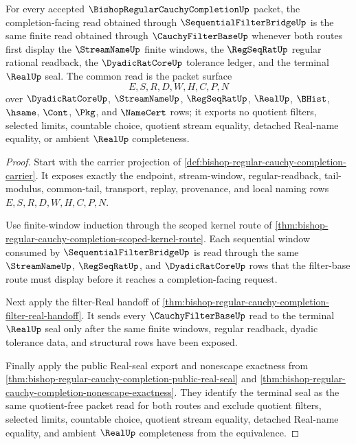 \begin{theorem}
\label{thm:bishop-regular-cauchy-completion-filterbase-sequential-equivalence}
For every accepted $\BishopRegularCauchyCompletionUp$ packet, the completion-facing read obtained through $\SequentialFilterBridgeUp$ is the same finite read obtained through $\CauchyFilterBaseUp$ whenever both routes first display the $\StreamNameUp$ finite windows, the $\RegSeqRatUp$ regular rational readback, the $\DyadicRatCoreUp$ tolerance ledger, and the terminal $\RealUp$ seal. The common read is the packet surface
$$
E,S,R,D,W,H,C,P,N
$$
over $\DyadicRatCoreUp$, $\StreamNameUp$, $\RegSeqRatUp$, $\RealUp$, $\BHist$, $\hsame$, $\Cont$, $\Pkg$, and $\NameCert$ rows; it exports no quotient filters, selected limits, countable choice, quotient stream equality, detached Real-name equality, or ambient $\RealUp$ completeness.
\end{theorem}
\begin{proof}
Start with the carrier projection of \autoref{def:bishop-regular-cauchy-completion-carrier}. It exposes exactly the endpoint, stream-window, regular-readback, tail-modulus, common-tail, transport, replay, provenance, and local naming rows $E,S,R,D,W,H,C,P,N$.

Use finite-window induction through the scoped kernel route of \autoref{thm:bishop-regular-cauchy-completion-scoped-kernel-route}. Each sequential window consumed by $\SequentialFilterBridgeUp$ is read through the same $\StreamNameUp$, $\RegSeqRatUp$, and $\DyadicRatCoreUp$ rows that the filter-base route must display before it reaches a completion-facing request.

Next apply the filter-Real handoff of \autoref{thm:bishop-regular-cauchy-completion-filter-real-handoff}. It sends every $\CauchyFilterBaseUp$ read to the terminal $\RealUp$ seal only after the same finite windows, regular readback, dyadic tolerance data, and structural rows have been exposed.

Finally apply the public Real-seal export and nonescape exactness from \autoref{thm:bishop-regular-cauchy-completion-public-real-seal} and \autoref{thm:bishop-regular-cauchy-completion-nonescape-exactness}. They identify the terminal seal as the same quotient-free packet read for both routes and exclude quotient filters, selected limits, countable choice, quotient stream equality, detached Real-name equality, and ambient $\RealUp$ completeness from the equivalence.
\end{proof}

